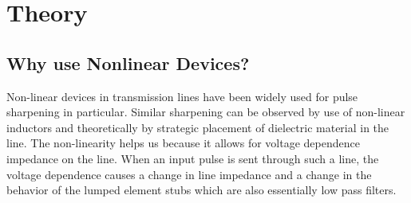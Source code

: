 \documentclass[journal]{IEEEtran} \usepackage[english]{babel}
\begin{document}






%



\section{ Theory }
\subsection{Why use Nonlinear Devices?}\label{sub:WhyNonLin}

Non-linear devices in transmission lines have been widely used for pulse
sharpening in particular. Similar sharpening can be observed by use of
non-linear inductors and theoretically by strategic placement of dielectric
material in the line\cite{wilson1991pulse}. The non-linearity helps us because
it allows for voltage dependence impedance on the line. When an input pulse is
sent through such a line, the voltage dependence causes a change in line
impedance and a change in the behavior of the lumped element stubs which are
also essentially low pass filters. 
\end{document}
